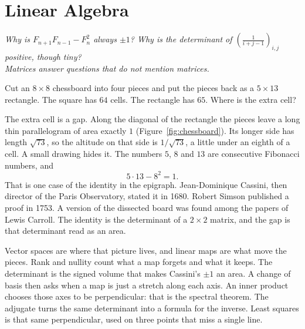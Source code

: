 \chapter{Linear Algebra}\label{ch:linear}

\begin{center}\itshape
Why is $F_{n+1}F_{n-1}-F_n^2$ always $\pm1$? Why is the determinant of $\left(\frac1{i+j-1}\right)_{i,j}$ positive, though tiny?\\
Matrices answer questions that do not mention matrices.
\end{center}

Cut an $8\times8$ chessboard into four pieces and put the pieces back as a $5\times13$ rectangle. The square has $64$ cells. The rectangle has $65$. Where is the extra cell?

The extra cell is a gap. Along the diagonal of the rectangle the pieces leave a long thin parallelogram of area exactly $1$ (Figure~\ref{fig:chessboard}). Its longer side has length $\sqrt{73}$, so the altitude on that side is $1/\sqrt{73}$, a little under an eighth of a cell. A small drawing hides it. The numbers $5$, $8$ and $13$ are consecutive Fibonacci numbers, and
\[
5\cdot13-8^2=1.
\]
That is one case of the identity in the epigraph. Jean-Dominique Cassini, then director of the Paris Observatory, stated it in 1680. Robert Simson published a proof in 1753. A version of the dissected board was found among the papers of Lewis Carroll. The identity is the determinant of a $2\times2$ matrix, and the gap is that determinant read as an area.

Vector spaces are where that picture lives, and linear maps are what move the pieces. Rank and nullity count what a map forgets and what it keeps. The determinant is the signed volume that makes Cassini's $\pm1$ an area. A change of basis then asks when a map is just a stretch along each axis. An inner product chooses those axes to be perpendicular: that is the spectral theorem. The adjugate turns the same determinant into a formula for the inverse. Least squares is that same perpendicular, used on three points that miss a single line.

